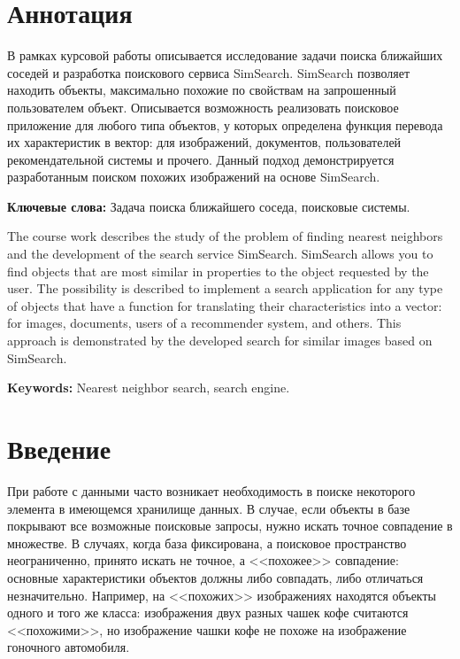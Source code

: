 \documentclass[a4paper,12pt]{extarticle}
\begin{document}
\newpage

{
	\hypersetup{linkcolor=black}
	\tableofcontents
}

\newpage



\section{Аннотация}

В рамках курсовой работы описывается исследование задачи поиска ближайших соседей и разработка поискового сервиса SimSearch. SimSearch позволяет находить объекты, максимально похожие по свойствам на запрошенный пользователем объект. Описывается возможность реализовать поисковое приложение для любого типа объектов, у которых определена функция перевода их характеристик в вектор: для изображений, документов, пользователей рекомендательной системы и прочего. Данный подход демонстрируется разработанным поиском похожих изображений на основе SimSearch.

\textbf{Ключевые слова:} Задача поиска ближайшего соседа, поисковые системы.

\hfill

The course work describes the study of the problem of finding nearest neighbors and the development of the search service SimSearch. SimSearch allows you to find objects that are most similar in properties to the object requested by the user. The possibility is described to implement a search application for any type of objects that have a function for translating their characteristics into a vector: for images, documents, users of a recommender system, and others. This approach is demonstrated by the developed search for similar images based on SimSearch.

\textbf{Keywords:} Nearest neighbor search, search engine.

\newpage

\section{Введение}

При работе с данными часто возникает необходимость в поиске некоторого элемента в имеющемся хранилище данных. В случае, если объекты в базе покрывают все возможные поисковые запросы, нужно искать точное совпадение в множестве. В случаях, когда база
фиксирована, а поисковое пространство неограниченно, принято искать не точное, а <<похожее>> совпадение: основные характеристики объектов должны либо совпадать, либо отличаться незначительно. Например, на <<похожих>> изображениях находятся объекты одного и того же класса: изображения двух разных чашек кофе считаются <<похожими>>, но изображение чашки кофе не похоже на изображение гоночного автомобиля.
\end{document}
